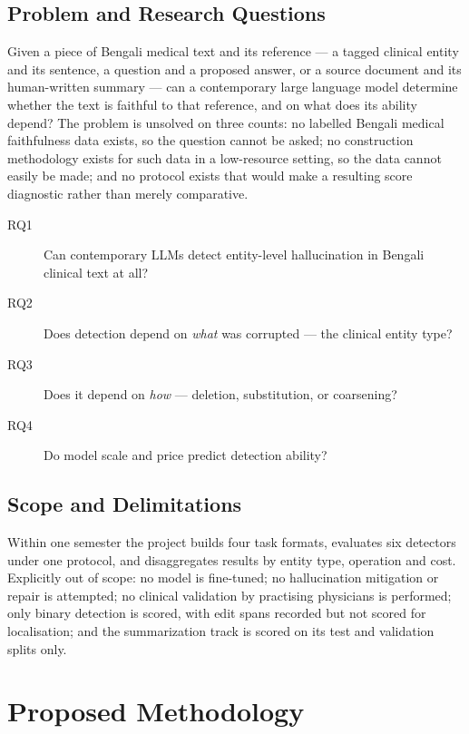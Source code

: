 \documentclass{iutbscthesis}
\begin{document}
\section{Problem and Research Questions}

Given a piece of Bengali medical text and its reference --- a tagged clinical entity and its sentence, a question and a proposed answer, or a source document and its human-written summary --- can a contemporary large language model determine whether the text is faithful to that reference, and on what does its ability depend? The problem is unsolved on three counts: no labelled Bengali medical faithfulness data exists, so the question cannot be asked; no construction methodology exists for such data in a low-resource setting, so the data cannot easily be made; and no protocol exists that would make a resulting score diagnostic rather than merely comparative.

\begin{description}
    \item[RQ1] Can contemporary LLMs detect entity-level hallucination in Bengali clinical text at all?
    \item[RQ2] Does detection depend on \emph{what} was corrupted --- the clinical entity type?
    \item[RQ3] Does it depend on \emph{how} --- deletion, substitution, or coarsening?
    \item[RQ4] Do model scale and price predict detection ability?
\end{description}

\section{Scope and Delimitations}

Within one semester the project builds four task formats, evaluates six detectors under one protocol, and disaggregates results by entity type, operation and cost. Explicitly out of scope: no model is fine-tuned; no hallucination mitigation or repair is attempted; no clinical validation by practising physicians is performed; only binary detection is scored, with edit spans recorded but not scored for localisation; and the summarization track is scored on its test and validation splits only.

\chapter{Proposed Methodology} \label{chapter:proposed}
\end{document}
